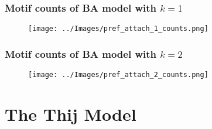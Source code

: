 \documentclass{beamer}
\begin{document}
\begin{frame}
    \frametitle{Motif counts of BA model with $k=1$}
    \begin{figure}
        \texttt{[image: ../Images/pref\_attach\_1\_counts.png]}
    \centering
    \end{figure}
\end{frame}



\begin{frame}
    \frametitle{Motif counts of BA model with $k=2$}
    \begin{figure}
        \texttt{[image: ../Images/pref\_attach\_2\_counts.png]}
    \centering
    \end{figure}
\end{frame}




\section{The Thij Model}
\end{document}

